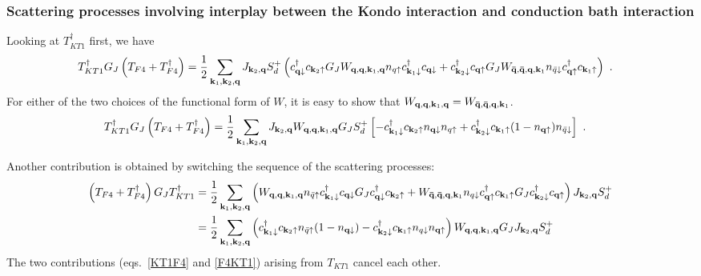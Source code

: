 \documentclass[reprint,hidelinks,onecolumn]{revtex4-2}
\begin{document}
\subsubsection*{Scattering processes involving interplay between the Kondo interaction and conduction bath interaction}
Looking at \(T_{KT1}^\dagger\) first, we have
\begin{equation}\begin{aligned}\label{t7t6}
	T_{KT1}^\dagger G_J \left(T_{F4} + T_{F4}^\dagger\right) &= \frac{1}{2}\sum_{{\bf k}_1,{\bf k}_2,{\bf q}} J_{{\bf k}_2, {\bf q}}S_d^+ \left(c^\dagger_{{\bf q}\downarrow}c_{{\bf k}_2\uparrow}  G_J W_{{\bf q}, {\bf q}, {\bf k}_1, {\bf q}} n_{q \uparrow} c^\dagger_{{\bf k}_1 \downarrow} c_{{\bf q} \downarrow} + c^\dagger_{{\bf k}_2\downarrow}c_{{\bf q}\uparrow}  G_J W_{{\bf \bar q}, {\bf \bar q}, {\bf q}, {\bf k}_1} n_{\bar q \downarrow} c^\dagger_{{\bf q} \uparrow} c_{{\bf k}_1 \uparrow}\right) ~.
\end{aligned}\end{equation}
For either of the two choices of the functional form of \(W\), it is easy to show that \(W_{{\bf q}, {\bf q}, {\bf k}_1, {\bf q}} = W_{{\bf \bar q}, {\bf \bar q}, {\bf q}, {\bf k}_1}\).
\begin{equation}\begin{aligned}\label{KT1F4}
	T_{KT1}^\dagger G_J \left(T_{F4} + T_{F4}^\dagger\right) &= \frac{1}{2}\sum_{{\bf k}_1,{\bf k}_2,{\bf q}} J_{{\bf k}_2, {\bf q}} W_{{\bf q}, {\bf q}, {\bf k}_1, {\bf q}} G_J S_d^+ \left[-c^\dagger_{{\bf k}_1 \downarrow}c_{{\bf k}_2\uparrow} n_{{\bf q}\downarrow} n_{q \uparrow} + c^\dagger_{{\bf k}_2\downarrow} c_{{\bf k}_1 \uparrow} (1 - n_{{\bf q}\uparrow}) n_{\bar q \downarrow}\right] ~.
\end{aligned}\end{equation}

Another contribution is obtained by switching the sequence of the scattering processes:
\begin{equation}\begin{aligned}\label{F4KT1}
	\left(T_{F4} + T_{F4}^\dagger\right) G_J T_{KT1}^\dagger &= \frac{1}{2}\sum_{{\bf k}_1,{\bf k}_2,{\bf q}} \left(W_{{\bf q}, {\bf q}, {\bf k}_1, {\bf q}} n_{\bar q \uparrow} c^\dagger_{{\bf k}_1 \downarrow} c_{{\bf q} \downarrow} G_J c^\dagger_{{\bf q}\downarrow}c_{{\bf k}_2\uparrow} + W_{{\bf \bar q}, {\bf \bar q}, {\bf q}, {\bf k}_1} n_{q \downarrow} c^\dagger_{{\bf q} \uparrow} c_{{\bf k}_1 \uparrow} G_J c^\dagger_{{\bf k}_2\downarrow}c_{{\bf q}\uparrow} \right) J_{{\bf k}_2, {\bf q}}S_d^+\\
															 &= \frac{1}{2}\sum_{{\bf k}_1,{\bf k}_2,{\bf q}} \left(c^\dagger_{{\bf k}_1 \downarrow} c_{{\bf k}_2\uparrow} n_{\bar q \uparrow} (1 - n_{{\bf q} \downarrow}) - c^\dagger_{{\bf k}_2\downarrow}c_{{\bf k}_1 \uparrow}n_{q \downarrow} n_{{\bf q} \uparrow}\right) W_{{\bf q}, {\bf q}, {\bf k}_1, {\bf q}} G_J J_{{\bf k}_2, {\bf q}}S_d^+
\end{aligned}\end{equation}
The two contributions (eqs.~\ref{KT1F4} and \ref{F4KT1}) arising from \(T_{KT1}\) cancel each other.
\end{document}
